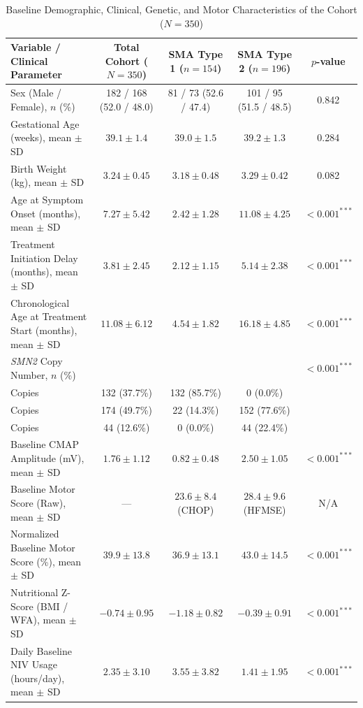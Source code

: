 \documentclass[journal]{IEEEtran}
\begin{document}
\begin{table}[!t]
\caption{Baseline Demographic, Clinical, Genetic, and Motor Characteristics of the Cohort ($N = 350$)}
\label{tab:demographics}
\centering
\begin{tabular}{lcccc}
\toprule
\textbf{Variable / Clinical Parameter} & \textbf{Total Cohort ($N = 350$)} & \textbf{SMA Type 1 ($n = 154$)} & \textbf{SMA Type 2 ($n = 196$)} & \textbf{$p$-value} \\
\midrule
Sex (Male / Female), $n$ (\%) & 182 / 168 (52.0 / 48.0) & 81 / 73 (52.6 / 47.4) & 101 / 95 (51.5 / 48.5) & 0.842 \\
Gestational Age (weeks), mean $\pm$ SD & $39.1 \pm 1.4$ & $39.0 \pm 1.5$ & $39.2 \pm 1.3$ & 0.284 \\
Birth Weight (kg), mean $\pm$ SD & $3.24 \pm 0.45$ & $3.18 \pm 0.48$ & $3.29 \pm 0.42$ & 0.082 \\
Age at Symptom Onset (months), mean $\pm$ SD & $7.27 \pm 5.42$ & $2.42 \pm 1.28$ & $11.08 \pm 4.25$ & $< 0.001^{***}$ \\
Treatment Initiation Delay (months), mean $\pm$ SD & $3.81 \pm 2.45$ & $2.12 \pm 1.15$ & $5.14 \pm 2.38$ & $< 0.001^{***}$ \\
Chronological Age at Treatment Start (months), mean $\pm$ SD & $11.08 \pm 6.12$ & $4.54 \pm 1.82$ & $16.18 \pm 4.85$ & $< 0.001^{***}$ \\
\textit{SMN2} Copy Number, $n$ (\%) & & & & $< 0.001^{***}$ \\
\quad 2 Copies & 132 (37.7\%) & 132 (85.7\%) & 0 (0.0\%) & \\
\quad 3 Copies & 174 (49.7\%) & 22 (14.3\%) & 152 (77.6\%) & \\
\quad 4 Copies & 44 (12.6\%) & 0 (0.0\%) & 44 (22.4\%) & \\
Baseline CMAP Amplitude (mV), mean $\pm$ SD & $1.76 \pm 1.12$ & $0.82 \pm 0.48$ & $2.50 \pm 1.05$ & $< 0.001^{***}$ \\
Baseline Motor Score (Raw), mean $\pm$ SD & --- & $23.6 \pm 8.4$ (CHOP) & $28.4 \pm 9.6$ (HFMSE) & N/A \\
Normalized Baseline Motor Score (\%), mean $\pm$ SD & $39.9 \pm 13.8$ & $36.9 \pm 13.1$ & $43.0 \pm 14.5$ & $< 0.001^{***}$ \\
Nutritional Z-Score (BMI / WFA), mean $\pm$ SD & $-0.74 \pm 0.95$ & $-1.18 \pm 0.82$ & $-0.39 \pm 0.91$ & $< 0.001^{***}$ \\
Daily Baseline NIV Usage (hours/day), mean $\pm$ SD & $2.35 \pm 3.10$ & $3.55 \pm 3.82$ & $1.41 \pm 1.95$ & $< 0.001^{***}$ \\

\end{tabular}
\end{table}
\end{document}
